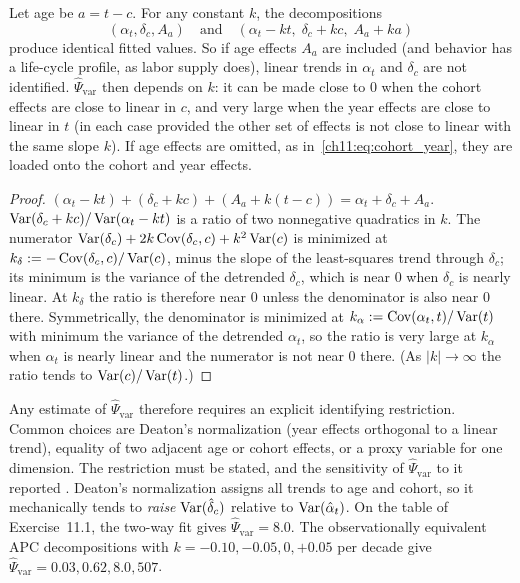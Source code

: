 \documentclass[../structural_economics_book.tex]{subfiles}
\begin{document}
\begin{proposition}\label{ch11:prop:apc}
Let age be $a = t - c$. For any constant $k$, the decompositions
\[
(\alpha_t, \delta_c, A_a) \quad\text{and}\quad (\alpha_t - kt,\; \delta_c + kc,\; A_a + ka)
\]
produce identical fitted values. So if age effects $A_a$ are included (and behavior has a life-cycle profile, as labor supply does), linear trends in $\alpha_t$ and $\delta_c$ are not identified. $\hat{\Psi}_{\text{var}}$ then depends on $k$: it can be made close to $0$ when the cohort effects are close to linear in $c$, and very large when the year effects are close to linear in $t$ (in each case provided the other set of effects is not close to linear with the same slope $k$). If age effects are omitted, as in~\eqref{ch11:eq:cohort_year}, they are loaded onto the cohort and year effects.
\end{proposition}

\begin{proof}
$(\alpha_t - kt) + (\delta_c + kc) + (A_a + k(t - c)) = \alpha_t + \delta_c + A_a$. $\operatorname{Var}(\delta_c + kc)/\operatorname{Var}(\alpha_t - kt)$ is a ratio of two nonnegative quadratics in $k$. The numerator $\operatorname{Var}(\delta_c) + 2k\operatorname{Cov}(\delta_c, c) + k^2\operatorname{Var}(c)$ is minimized at $k_\delta := -\operatorname{Cov}(\delta_c, c)/\operatorname{Var}(c)$, minus the slope of the least-squares trend through $\delta_c$; its minimum is the variance of the detrended $\delta_c$, which is near $0$ when $\delta_c$ is nearly linear. At $k_\delta$ the ratio is therefore near $0$ unless the denominator is also near $0$ there. Symmetrically, the denominator is minimized at $k_\alpha := \operatorname{Cov}(\alpha_t, t)/\operatorname{Var}(t)$ with minimum the variance of the detrended $\alpha_t$, so the ratio is very large at $k_\alpha$ when $\alpha_t$ is nearly linear and the numerator is not near $0$ there. (As $|k| \to \infty$ the ratio tends to $\operatorname{Var}(c)/\operatorname{Var}(t)$.)
\end{proof}

Any estimate of $\hat{\Psi}_{\text{var}}$ therefore requires an explicit identifying restriction. Common choices are Deaton's normalization (year effects orthogonal to a linear trend), equality of two adjacent age or cohort effects, or a proxy variable for one dimension. The restriction must be stated, and the sensitivity of $\hat{\Psi}_{\text{var}}$ to it reported \citep{hall1971measurement,heckman1985using,deaton1994saving,mckenzie2006disentangling,fosse2019analyzing}. Deaton's normalization assigns all trends to age and cohort, so it mechanically tends to \textit{raise} $\operatorname{Var}(\hat{\delta}_c)$ relative to $\operatorname{Var}(\hat{\alpha}_t)$. On the table of Exercise~11.1, the two-way fit gives $\hat{\Psi}_{\text{var}} = 8.0$. The observationally equivalent APC decompositions with $k = -0.10, -0.05, 0, +0.05$ per decade give $\hat{\Psi}_{\text{var}} = 0.03, 0.62, 8.0, 507$.
\end{document}

